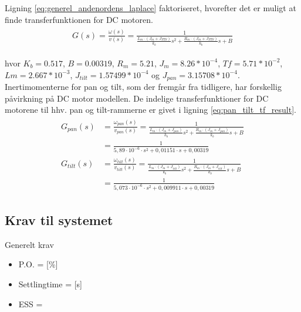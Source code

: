 Ligning \ref{eq:generel_andenordens_laplace} faktoriseret, hvorefter det er muligt at finde transferfunktionen for DC motoren. 
\begin{align}
\begin{split}
G\left( s \right) =\frac { \omega \left( s \right)  }{ v\left( s \right)  } =\frac { 1 }{ \frac { { L }_{ m }\cdot \left( { J }_{ m }+{ J }_{ PTS } \right)  }{ { k }_{ b } } { s }^{ 2 }+\frac { { R }_{ m }\cdot \left( { J }_{ m }+{ J }_{ PTS } \right)  }{ { k }_{ b } } s+B } 
\label{eq:generel_tf}
\end{split}
\end{align}

hvor 
\(K_b = 0.517\), \(B=0.00319\), \(R_m=5.21\), \(J_m=8.26*10^{-4}\), \(Tf=5.71*10^{-2}\), \(Lm=2.667*10^{-3}\), \(J_{tilt}=1.57499*10^{-4}\) og \(J_{pan}=3.15708*10^{-4}\).\\
Inertimomenterne for pan og tilt, som der fremgår fra tidligere, har forskellig påvirkning på DC motor modellen. De indelige transferfunktioner for DC motorene til hhv. pan og tilt-rammerne er givet i ligning \ref{eq:pan_tilt_tf_result}. 
\begin{align}
\begin{split}
G_{ pan }\left( s \right) &=\frac { \omega _{ pan }\left( s \right)  }{ v_{ pan }\left( s \right)  } =\frac { 1 }{ \frac { { L }_{ m }\cdot  \left( { J }_{ m }+{ J }_{ pan } \right) }{ { k }_{ b } } { s }^{ 2 }+\frac { { R }_{ m }\cdot  \left( { J }_{ m }+{ J }_{ pan } \right) }{ { k }_{ b } } s+B } 
\\
&=\frac { 1 }{ 5,89\cdot { 10 }^{ -6 }\cdot { s }^{ 2 }+0,01151\cdot s+0,00319 } 
\\
G_{ tilt }\left( s \right) &=\frac { \omega _{ tilt }\left( s \right)  }{ v_{ tilt }\left( s \right)  } =\frac { 1 }{ \frac { { L }_{ m }\cdot  \left( { J }_{ m }+{ J }_{ tilt } \right) }{ { k }_{ b } } { s }^{ 2 }+\frac { { R }_{ m }\cdot \left( { J }_{ m }+{ J }_{ tilt } \right) }{ { k }_{ b } } s+B } 
\\
&= \frac { 1 }{ 5,073\cdot { 10 }^{ -6 }\cdot { s }^{ 2 }+0,009911\cdot s+0,00319 } 
\label{eq:pan_tilt_tf_result}
\end{split}
\end{align}

\subsection{Krav til systemet}
Generelt krav
\begin{itemize}
\item P.O. = [\%]
\item Settlingtime = [s]
\item ESS = 
\end{itemize}


